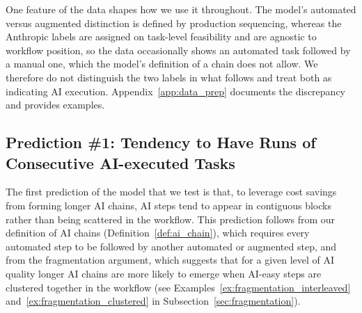 One feature of the data shapes how we use it throughout.
The model's automated versus augmented distinction is defined by production sequencing, whereas the Anthropic labels are assigned on task-level feasibility and are agnostic to workflow position, so the data occasionally shows an automated task followed by a manual one, which the model's definition of a chain does not allow.
We therefore do not distinguish the two labels in what follows and treat both as indicating AI execution.
Appendix~\ref{app:data_prep} documents the discrepancy and provides examples.


\subsection{Prediction \#1: Tendency to Have Runs of Consecutive AI-executed Tasks}
\label{sec:chainLength_prediction}

The first prediction of the model that we test is that, to leverage cost savings from forming longer AI chains, AI steps tend to appear in contiguous blocks rather than being scattered in the workflow.
This prediction follows from our definition of AI chains (Definition~\ref{def:ai_chain}), which requires every automated step to be followed by another automated or augmented step, and from the fragmentation argument, which suggests that for a given level of AI quality longer AI chains are more likely to emerge when AI-easy steps are clustered together in the workflow (see Examples~\ref{ex:fragmentation_interleaved} and~\ref{ex:fragmentation_clustered} in Subsection~\ref{sec:fragmentation}).

